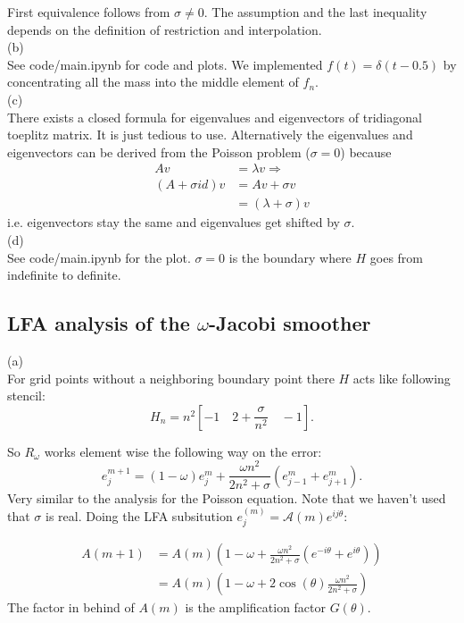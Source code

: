 \documentclass[a4paper,12pt]{article}
\begin{document}
First equivalence follows from $\sigma \neq 0$. The assumption and the last inequality depends on the definition of
restriction and interpolation. \\
(b) \\
See code/main.ipynb for code and plots. We implemented $f(t) = \delta(t-0.5)$ by concentrating all the mass into the
middle element of $f_n$.\\
(c) \\
There exists a closed formula for eigenvalues and eigenvectors of tridiagonal toeplitz matrix. It is just tedious to
use. Alternatively the eigenvalues and eigenvectors can be derived from the Poisson problem ($\sigma=0$) because
\begin{align}
    Av             & = \lambda v \Rightarrow \\
    (A+\sigma id)v & = Av + \sigma v         \\
                   & = (\lambda+\sigma)v
\end{align}
i.e. eigenvectors stay the same and eigenvalues get shifted by $\sigma$. \\

(d) \\
See code/main.ipynb for the plot. $\sigma = 0$ is the boundary where $H$ goes from indefinite to definite.

\subsection{LFA analysis of the $\omega$-Jacobi smoother}
(a) \\
For grid points without a neighboring boundary point there
$H$ acts like following stencil:
\[
    H_n = n^{2} [ -1 \quad 2+ \frac{\sigma}{n^{2}}  \quad -1]
    .\]

So $R_{\omega}$ works element wise the following way on the error:
\begin{equation}
    e_{j}^{m+1} = (1-\omega) e_{j} ^{m} + \frac{\omega n^{2}}{2 n^{2} + \sigma} (e_{j-1} ^{m} + e_{j+1}^{m})
    .
\end{equation}
Very similar to the analysis for the Poisson equation. Note that we haven't used that $\sigma$ is real.
Doing the LFA subsitution $e_j^{(m)}=\mathcal{A}(m) e^{i j \theta}$:

\begin{align}
    A(m+1) & = A(m) \left( 1-\omega + \frac{\omega n^{2}}{2 n^{2} + \sigma} (e^{-i\theta} + e^{i\theta}) \right) \\
           & = A(m) \left( 1-\omega + 2 \cos(\theta) \frac{\omega n^{2}}{2 n^{2} + \sigma}   \right)
\end{align}
The factor in behind of $A(m)$ is the amplification factor $G(\theta)$.
\end{document}
